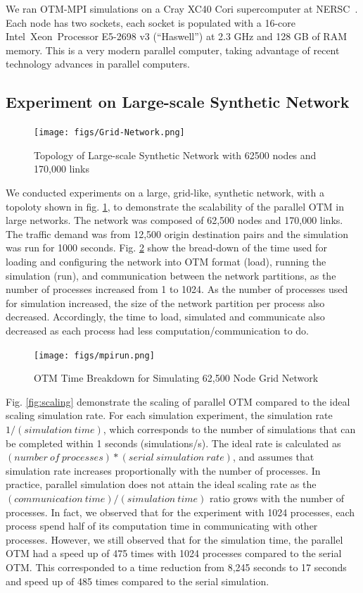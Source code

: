 We ran OTM-MPI simulations on a Cray XC40 Cori supercomputer at NERSC~\cite{Cori}. Each node has two sockets, each socket is
populated with a 16-core Intel\textcopyright~Xeon\texttrademark~Processor E5-2698 v3 (``Haswell'') at 2.3 GHz and 128 GB of RAM memory. This is a very modern parallel computer, taking advantage of recent technology advances in parallel computers.

\subsection{Experiment on Large-scale Synthetic Network}
\begin{figure}[h!]
    \centering
    \texttt{[image: figs/Grid-Network.png]}
    \caption{Topology of Large-scale Synthetic Network with 62500 nodes and 170,000 links}
    \label{fig:Synthetic_Network}
\end{figure}

We conducted experiments on a large, grid-like, synthetic network, with a topoloty shown in fig. \ref{fig:Synthetic_Network}, to demonstrate the scalability of the parallel OTM in large networks. The network was composed of 62,500 nodes and 170,000 links. The traffic demand was from 12,500 origin destination pairs and the simulation was run for 1000 seconds. Fig. \ref{fig:mpirun} show the bread-down of the time used for loading and configuring the network into OTM format (load), running the simulation (run), and communication between the network partitions, as the number of processes increased from 1 to 1024. As the number of processes used for simulation increased, the size of the network partition per process also decreased. Accordingly, the time to load, simulated and communicate also decreased as each process had less computation/communication to do.

\begin{figure}[h!]
    \centering
    \texttt{[image: figs/mpirun.png]}
    \caption{OTM Time Breakdown for Simulating 62,500 Node Grid Network}
    \label{fig:mpirun}
\end{figure}
Fig. \ref{fig:scaling} demonstrate the scaling of parallel OTM compared to the ideal scaling simulation rate. For each simulation experiment, the simulation rate $1/(simulation \:time)$, which corresponds to the number of simulations that can be completed within 1 seconds (simulations/s). The ideal rate is calculated as $(number\: of\: processes)*(serial\: simulation\: rate)$, and assumes that simulation rate increases proportionally with the number of processes. In practice, parallel simulation does not attain the ideal scaling rate as the $(communication\:time)/(simulation\:time)$ ratio grows with the number of processes. In fact, we observed that for the experiment with 1024 processes, each process spend half of its computation time in communicating with other processes. However, we still observed that for the simulation time, the parallel OTM had a speed up of 475 times with 1024 processes compared to the serial OTM. This corresponded to a time reduction from 8,245 seconds to 17 seconds and speed up of 485 times compared to the serial simulation.


